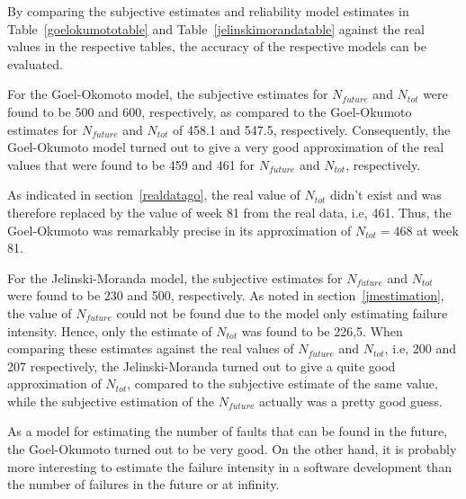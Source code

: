 By comparing the subjective estimates and reliability model estimates in Table~\ref{goelokumototable} and Table~\ref{jelinskimorandatable} against the real values in the respective tables, the accuracy of the respective models can be evaluated. 

For the Goel-Okomoto model, the subjective estimates for $N_{future}$ and $N_{tot}$ were found to be 500 and 600, respectively, as compared to the Goel-Okumoto estimates for $N_{future}$ and $N_{tot}$ of 458.1 and 547.5, respectively. Consequently, the Goel-Okumoto model turned out to give a very good approximation of the real values that were found to be 459 and 461 for $N_{future}$ and $N_{tot}$, respectively. 

As indicated in section~\ref{realdatago}, the real value of $N_{tot}$ didn't exist and was therefore replaced by the value of week 81 from the real data, i.e, 461. Thus, the Goel-Okumoto was remarkably precise in its approximation of $N_{tot}=468$ at week 81. 

For the Jelinski-Moranda model, the subjective estimates for $N_{future}$ and $N_{tot}$ were found to be 230 and 500, respectively. As noted in section~\ref{jmestimation}, the value of $N_{future}$ could not be found due to the model only estimating failure intensity. Hence, only the estimate of $N_{tot}$ was found to be 226,5. When comparing these estimates against the real values of $N_{future}$ and $N_{tot}$, i.e, 200 and 207 respectively, the Jelinski-Moranda turned out to give a quite good approximation of $N_{tot}$, compared to the subjective estimate of the same value, while the subjective estimation of the $N_{future}$ actually was a pretty good guess. 

As a model for estimating the number of faults that can be found in the future, the Goel-Okumoto turned out to be very good. On the other hand, it is probably more interesting to estimate the failure intensity in a software development than the number of failures in the future or at infinity. 